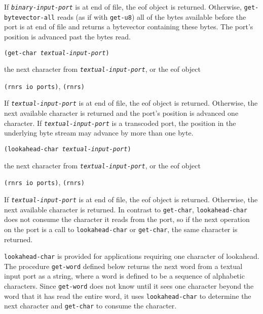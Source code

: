 If \texttt{\textit{binary-input-port}} is at end of file, the eof object is returned.
Otherwise, \texttt{get-bytevector-all} reads (as if with \texttt{get-u8})
all of the bytes available before the port is at end of file and
returns a bytevector containing these bytes.
The port's position is advanced past the bytes read.


\begin{description}

\label{io_s61}\item[procedure] \texttt{(get-char \textit{textual-input-port})}



\item[returns] the next character from \texttt{\textit{textual-input-port}}, or the eof object


\item[libraries] \texttt{(rnrs io ports)}, \texttt{(rnrs)}
\end{description}


If \texttt{\textit{textual-input-port}} is at end of file, the eof object is returned.
Otherwise, the next available character is returned
and the port's position is advanced one character.
If \texttt{\textit{textual-input-port}} is a transcoded port, the position in the
underlying byte stream may advance by more than one byte.


\begin{description}

\label{io_s62}\item[procedure] \texttt{(lookahead-char \textit{textual-input-port})}



\item[returns] the next character from \texttt{\textit{textual-input-port}}, or the eof object


\item[libraries] \texttt{(rnrs io ports)}, \texttt{(rnrs)}
\end{description}


If \texttt{\textit{textual-input-port}} is at end of file, the eof object is returned.
Otherwise, the next available character is returned.
In contrast to \texttt{get-char}, \texttt{lookahead-char} does not consume
the character it reads from the port, so if the next operation on the port
is a call to \texttt{lookahead-char} or \texttt{get-char}, the same
character is returned.

\texttt{lookahead-char} is provided for applications requiring one
character of lookahead.
The procedure \texttt{get-word} defined below
returns the next word from a textual input port as a string, where
a word is defined to be a sequence of alphabetic characters.
Since \texttt{get-word} does not know until it sees one character
beyond the word that it has read the entire word, it uses
\texttt{lookahead-char} to determine the next character and
\texttt{get-char} to consume the character.

